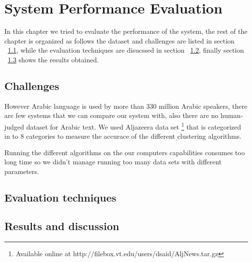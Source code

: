 
\chapter{System Performance Evaluation} %

\label{eval} %

In this chapter we tried to evaluate the performance of the system, the rest of the chapter is organized as follows the dataset and challenges are listed in section ~\ref{sec:challenges}, while the evaluation techniques are disucssed in section ~\ref{sec:tech}, finally section ~\ref{sec:results} shows the results obtained.

\section{Challenges}\label{sec:challenges}
However Arabic language is used by more than $330$ million Arabic speakers, there are few systems that we can compare our system with, also there are no human-judged dataset for Arabic text. We used Aljazeera data set \footnote[1]{Available online at http://filebox.vt.edu/users/dsaid/AljNews.tar.gz} that is categorized in to $8$ categories to measure the accurace of the different clustering algorithms.

Running the different algorithms on the our computers capabilities consumes too long time so we didn't manage running too many data sets with different parameters.

\section{Evaluation techniques}\label{sec:tech}

\section{Results and discussion}\label{sec:results}